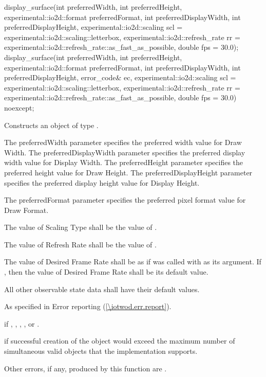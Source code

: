 \begin{itemdecl}
display_surface(int preferredWidth, int preferredHeight, 
  experimental::io2d::format preferredFormat,
  int preferredDisplayWidth, int preferredDisplayHeight,
  experimental::io2d::scaling scl = experimental::io2d::scaling::letterbox,
    experimental::io2d::refresh_rate rr =
    experimental::io2d::refresh_rate::as_fast_as_possible, double fps = 30.0);
display_surface(int preferredWidth, int preferredHeight, 
  experimental::io2d::format preferredFormat,
  int preferredDisplayWidth, int preferredDisplayHeight, error_code& ec,
  experimental::io2d::scaling scl = experimental::io2d::scaling::letterbox,
    experimental::io2d::refresh_rate rr =
    experimental::io2d::refresh_rate::as_fast_as_possible, double fps = 30.0) 
  noexcept;
\end{itemdecl}
\begin{itemdescr}
\pnum
\effects
Constructs an object of type .

\pnum
The preferredWidth parameter specifies the preferred width value for Draw Width. The preferredDisplayWidth parameter specifies the preferred display width value for Display Width. The preferredHeight parameter specifies the preferred height value for Draw Height. The preferredDisplayHeight parameter specifies the preferred display height value for Display Height.

\pnum
The preferredFormat parameter specifies the preferred pixel format value for Draw Format.

\pnum
The value of Scaling Type shall be the value of .

\pnum
The value of Refresh Rate shall be the value of .

\pnum
The value of Desired Frame Rate shall be as if  was called with  as its argument. If , then the value of Desired Frame Rate shall be its default value.

\pnum
All other observable state data shall have their default values.

\pnum
\throws
As specified in Error reporting (\ref{\iotwod.err.report}).

\pnum
\errors
{} if , , , , or .

 if successful creation of the  object would exceed the maximum number of simultaneous valid  objects that the implementation supports.

\pnum
Other errors, if any, produced by this function are .
\end{itemdescr}

